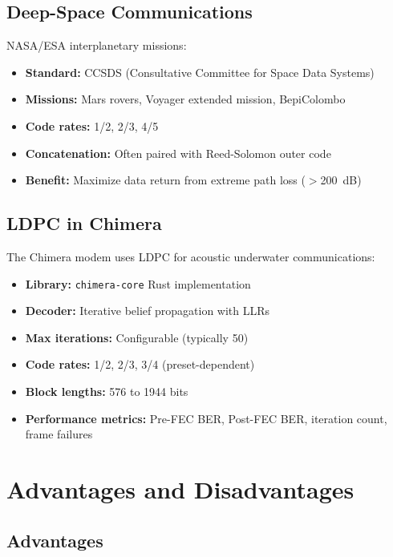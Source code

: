 \subsection{Deep-Space Communications}

NASA/ESA interplanetary missions:
\begin{itemize}
\item \textbf{Standard:} CCSDS (Consultative Committee for Space Data Systems)
\item \textbf{Missions:} Mars rovers, Voyager extended mission, BepiColombo
\item \textbf{Code rates:} 1/2, 2/3, 4/5
\item \textbf{Concatenation:} Often paired with Reed-Solomon outer code
\item \textbf{Benefit:} Maximize data return from extreme path loss ($>$200~dB)
\end{itemize}

\subsection{LDPC in Chimera}

The Chimera modem uses LDPC for acoustic underwater communications:
\begin{itemize}
\item \textbf{Library:} \texttt{chimera-core} Rust implementation
\item \textbf{Decoder:} Iterative belief propagation with LLRs
\item \textbf{Max iterations:} Configurable (typically 50)
\item \textbf{Code rates:} 1/2, 2/3, 3/4 (preset-dependent)
\item \textbf{Block lengths:} 576 to 1944 bits
\item \textbf{Performance metrics:} Pre-FEC BER, Post-FEC BER, iteration count, frame failures
\end{itemize}

\section{Advantages and Disadvantages}

\subsection{Advantages}

